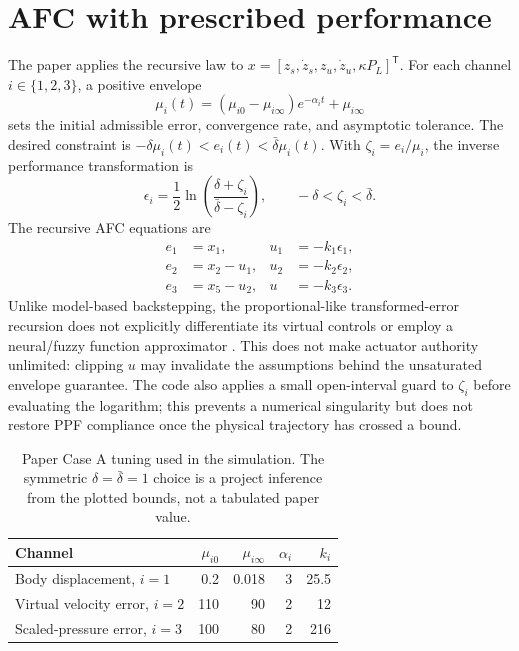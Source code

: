 \documentclass[10pt,a4paper]{article}
\begin{document}
\section{AFC with prescribed performance}
The paper applies the recursive law to \(x=[z_s,\dot z_s,z_u,\dot z_u,\kappa P_L]^\mathsf{T}\). For each channel \(i\in\{1,2,3\}\), a positive envelope
\begin{equation}
 \mu_i(t)=(\mu_{i0}-\mu_{i\infty})e^{-\alpha_i t}+\mu_{i\infty}
 \label{eq:ppf}
\end{equation}
sets the initial admissible error, convergence rate, and asymptotic tolerance. The desired constraint is \(-\delta\mu_i(t)<e_i(t)<\bar\delta\mu_i(t)\). With \(\zeta_i=e_i/\mu_i\), the inverse performance transformation is
\begin{equation}
 \epsilon_i=\frac12\ln\left(\frac{\delta+\zeta_i}{\bar\delta-\zeta_i}\right),
 \qquad -\delta<\zeta_i<\bar\delta.
 \label{eq:transform}
\end{equation}
The recursive AFC equations are
\begin{align}
 e_1&=x_1, &u_1&=-k_1\epsilon_1,\\
 e_2&=x_2-u_1, &u_2&=-k_2\epsilon_2,\\
 e_3&=x_5-u_2, &u&=-k_3\epsilon_3. \label{eq:afc}
\end{align}
Unlike model-based backstepping, the proportional-like transformed-error recursion does not explicitly differentiate its virtual controls or employ a neural/fuzzy function approximator \cite{na2022}. This does not make actuator authority unlimited: clipping \(u\) may invalidate the assumptions behind the unsaturated envelope guarantee.
The code also applies a small open-interval guard to \(\zeta_i\) before evaluating the logarithm; this prevents a numerical singularity but does not restore PPF compliance once the physical trajectory has crossed a bound.

\begin{table}[!htbp]
\centering\small
\caption{Paper Case A tuning used in the simulation. The symmetric \(\delta=\bar\delta=1\) choice is a project inference from the plotted bounds, not a tabulated paper value.}
\label{tab:caseA}
\begin{tabular}{@{}lrrrr@{}}
\toprule
Channel & \(\mu_{i0}\) & \(\mu_{i\infty}\) & \(\alpha_i\) & \(k_i\)\\
\midrule
Body displacement, \(i=1\) & 0.2 & 0.018 & 3 & 25.5\\
Virtual velocity error, \(i=2\) & 110 & 90 & 2 & 12\\
Scaled-pressure error, \(i=3\) & 100 & 80 & 2 & 216\\
\bottomrule
\end{tabular}
\end{table}
\end{document}
